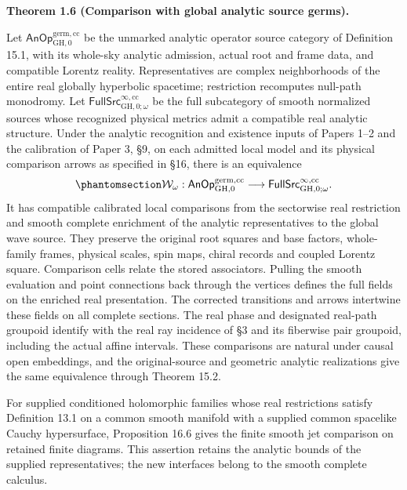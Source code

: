 \documentclass[
  english,
  11pt,
  reqno]{amsart}
\makeatletter
\newcommand{\pandocstatementheading}[1]{%
  \par\if@nobreak\else
    \addpenalty{\@beginparpenalty}%
    \addvspace{.5\baselineskip plus .2\baselineskip minus .2\baselineskip}%
  \fi
  {\normalfont\bfseries #1\par}%
  \nobreak\@afterindenttrue\@afterheading
}
\makeatother
\begin{document}
\pandocstatementheading{\protect{}\label{thm:global-analytic-comparison-overview}Theorem 1.6 (Comparison with global analytic source germs).}

Let \(\mathsf{AnOp}^{\mathrm{germ},\mathrm{cc}}_{\mathrm{GH},0}\) be the
unmarked analytic operator source category of Definition 15.1, with its
whole-sky analytic admission, actual root and frame data, and compatible
Lorentz reality. Representatives are complex neighborhoods of the entire
real globally hyperbolic spacetime; restriction recomputes null-path
monodromy. Let
\(\mathsf{FullSrc}^{\infty,\mathrm{cc}}_{\mathrm{GH},0;\omega}\) be the
full subcategory of smooth normalized sources whose recognized physical
metrics admit a compatible real analytic structure. Under the analytic
recognition and existence inputs of Papers 1--2 and the calibration of
Paper 3, §9, on each admitted local model and its physical comparison
arrows as specified in §16, there is an equivalence
\begin{equation}\protect\phantomsection\label{eq:global-analytic-comparison-overview}{
\mathcal W_\omega:
\mathsf{AnOp}^{\mathrm{germ},\mathrm{cc}}_{\mathrm{GH},0}
\longrightarrow
\mathsf{FullSrc}^{\infty,\mathrm{cc}}_{\mathrm{GH},0;\omega}.
}\end{equation} It has compatible calibrated local comparisons from the
sectorwise real restriction and smooth complete enrichment of the
analytic representatives to the global wave source. They preserve the
original root squares and base factors, whole-family frames, physical
scales, spin maps, chiral records and coupled Lorentz square. Comparison
cells relate the stored associators. Pulling the smooth evaluation and
point connections back through the vertices defines the full fields on
the enriched real presentation. The corrected transitions and arrows
intertwine these fields on all complete sections. The real phase and
designated real-path groupoid identify with the real ray incidence of §3
and its fiberwise pair groupoid, including the actual affine intervals.
These comparisons are natural under causal open embeddings, and the
original-source and geometric analytic realizations give the same
equivalence through Theorem 15.2.

For supplied conditioned holomorphic families whose real restrictions
satisfy Definition 13.1 on a common smooth manifold with a supplied
common spacelike Cauchy hypersurface, Proposition 16.6 gives the finite
smooth jet comparison on retained finite diagrams. This assertion
retains the analytic bounds of the supplied representatives; the new
interfaces belong to the smooth complete calculus.
\end{document}
